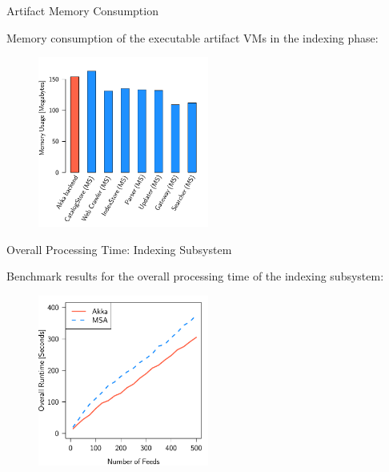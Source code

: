 \documentclass{beamer}
\begin{document}
\begin{frame}{Artifact Memory Consumption}

Memory consumption of the executable artifact VMs in the indexing phase:

\begin{center}
  \begin{figure} 
    \includegraphics[width=0.5\textwidth]{graphics/eval-index-mem.pdf} 
  \end{figure}
\end{center}

\end{frame}


\begin{frame}{Overall Processing Time: Indexing Subsystem}

Benchmark results for the overall processing time of the indexing subsystem:

\begin{center}
  \begin{figure} 
    \includegraphics[width=0.5\textwidth]{graphics/eval-index-overall.pdf} 
  \end{figure}
\end{center}

\end{frame}
\end{document}
